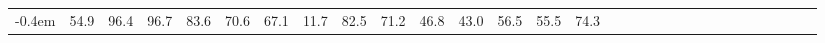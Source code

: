 \documentclass{article}
\begin{document}
\begin{table*}[]
\begin{tabular}{cc|cccccccccccccccccccccccccccc}
-0.4em} & \hspace{-0.9em}54.9\hspace{-0.4em} & \hspace{-0.9em}96.4\hspace{-0.4em} & \hspace{-0.9em}96.7\hspace{-0.4em} & \hspace{-0.9em}83.6\hspace{-0.4em} & \hspace{-0.9em}70.6\hspace{-0.4em} & \hspace{-0.9em}67.1\hspace{-0.4em} & \hspace{-0.9em}11.7\hspace{-0.4em} & \hspace{-0.9em}82.5\hspace{-0.4em} & \hspace{-0.9em}71.2\hspace{-0.4em} & \hspace{-0.9em}46.8\hspace{-0.4em} & \hspace{-0.9em}43.0\hspace{-0.4em} & \hspace{-0.9em}56.5\hspace{-0.4em} & \hspace{-0.9em}55.5\hspace{-0.4em} & \hspace{-0.9em}74.3\hspace{-0.4em} 
        \\

\end{tabular}
\end{table*}
\end{document}
